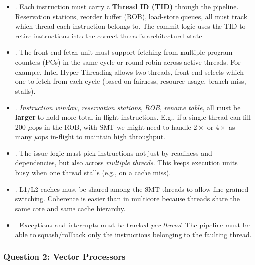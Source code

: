 \begin{itemize}
\begin{itemize}
        \item {}. Each instruction must carry a \textbf{Thread ID (TID)} through the pipeline. Reservation stations, reorder buffer (ROB), load-store queues, all must track which thread each instruction belongs to. The commit logic uses the TID to retire instructions into the correct thread's architectural state.
        
        \item {}. The front-end fetch unit must support fetching from multiple program counters (PCs) in the same cycle or round-robin across active threads. For example, Intel Hyper-Threading allows two threads, front-end selects which one to fetch from each cycle (based on fairness, resource usage, branch miss, stalls).
        
        \item {}. \emph{Instruction window}, \emph{reservation stations}, \emph{ROB}, \emph{rename table}, all must be \textbf{larger} to hold more total in-flight instructions. E.g., if a single thread can fill 200 $\mu$ops in the ROB, with SMT we might need to handle $2\times$ or $4\times$ as many $\mu$ops in-flight to maintain high throughput.
        
        \item {}. The issue logic must pick instructions not just by readiness and dependencies, but also across \emph{multiple threads}. This keeps execution units busy when one thread stalls (e.g., on a cache miss).
        
        \item {}. L1/L2 caches must be shared among the SMT threads to allow fine-grained switching. Coherence is easier than in multicore because threads share the same core and same cache hierarchy.
        
        \item {}. Exceptions and interrupts must be tracked \emph{per thread}. The pipeline must be able to squash/rollback only the instructions belonging to the faulting thread.
    \end{itemize}
\end{itemize}

\newpage

\subsubsection*{Question 2: Vector Processors}

